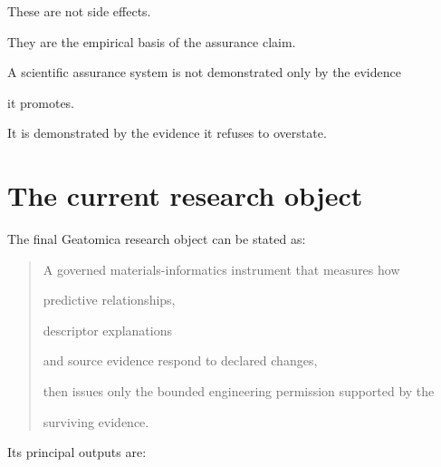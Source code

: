 \documentclass[11pt,a4paper,oneside]{report}
\begin{document}
These are not side effects.



They are the empirical basis of the assurance claim.





\begin{governingrule}



A scientific assurance system is not demonstrated only by the evidence

it promotes.



It is demonstrated by the evidence it refuses to overstate.



\end{governingrule}





\section{The current research object}



The final Geatomica research object can be stated as:



\begin{quote}



A governed materials-informatics instrument that measures how

predictive relationships,

descriptor explanations

and source evidence respond to declared changes,

then issues only the bounded engineering permission supported by the

surviving evidence.



\end{quote}



Its principal outputs are:
\end{document}
